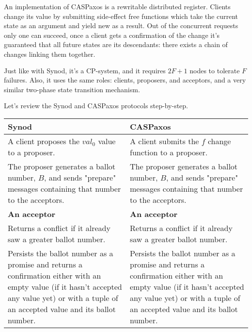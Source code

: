 \documentclass[a4paper,USenglish]{lipics-v2018}
\theoremstyle{definition}
\begin{document}
An implementation of CASPaxos is a rewritable distributed register. Clients change its value by submitting side-effect free functions which take the current state as an argument and yield new as a result. Out of the concurrent requests only one can succeed, once a client gets a confirmation of the change it's guaranteed that all future states are its descendants: there exists a chain of changes linking them together.

Just like with Synod, it's a CP-system, and it requires $2F+1$ nodes to tolerate $F$ failures. Also, it uses the same roles: clients, proposers, and acceptors, and a very similar two-phase state transition mechanism.

Let's review the Synod and CASPaxos protocols step-by-step.

\begin{center}
    \begin{longtable}{p{15em}|p{15em}} 
        \hline
        {\bf Synod}
        &
        {\bf CASPaxos} \\ 
        \hline
        \endfirsthead
    
        \endhead
        \endfoot
        \endlastfoot
      
        A client proposes the $val_0$ value to a proposer.
        &
        A client submits the $f$ change function to a proposer. \\
      
        \hline
        
        The proposer generates a ballot number, $B$, and sends "prepare" messages containing   that number to the acceptors.
        &
        The proposer generates a ballot number, $B$, and sends "prepare" messages containing   that number to the acceptors. \\
        
        \hline
        
        {\bf An acceptor}
        &
        {\bf An acceptor} \\[6pt]
        
        
        Returns a conflict if it already saw a greater ballot number.
        &
        Returns a conflict if it already saw a greater ballot number.
        \\[6pt]
        
        
        Persists the ballot number as a promise and returns a confirmation either with an   empty value (if it hasn't accepted any value yet) or with a tuple of an accepted   value and its ballot number.
        &
        Persists the ballot number as a promise and returns a confirmation either with an   empty value (if it hasn't accepted any value yet) or with a tuple of an accepted   value and its ballot number.
        \\[6pt]
        

\end{longtable}
\end{center}
\end{document}
